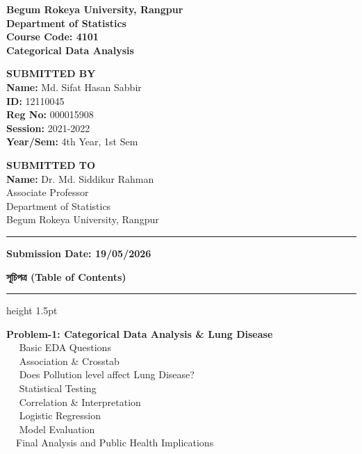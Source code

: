 \documentclass[12pt,a4paper]{article}
\newcommand{\tocline}[1]{\vspace{0.25cm}\noindent\textbf{\large #1}\\[0.1cm]}
\newcommand{\tocsub}[1]{\noindent\hspace*{6mm}\textbullet~~#1\\[0.05cm]}
\begin{document}
\begin{titlepage}
\centering
{\Large\bfseries Begum Rokeya University, Rangpur}\\[0.4cm]
{\large\bfseries Department of Statistics}\\[2.5cm]
\vfill
{\large\bfseries Course Code: 4101}\\[0.3cm]
{\LARGE\bfseries Categorical Data Analysis}\\[3cm]
\vfill

\begin{minipage}[t]{0.48\textwidth}
\raggedright
{\large\bfseries SUBMITTED BY}\\[0.2cm]
\textbf{Name:} Md. Sifat Hasan Sabbir\\
\textbf{ID:} 12110045\\
\textbf{Reg No:} 000015908\\
\textbf{Session:} 2021-2022\\
\textbf{Year/Sem:} 4th Year, 1st Sem
\end{minipage}
\hfill
\begin{minipage}[t]{0.48\textwidth}
\raggedleft
{\large\bfseries SUBMITTED TO}\\[0.2cm]
\textbf{Name:} Dr. Md. Siddikur Rahman\\
Associate Professor\\
Department of Statistics\\
Begum Rokeya University, Rangpur
\end{minipage}

\vfill
\hrule
\vspace{0.3cm}
{\large\bfseries Submission Date: 19/05/2026}
\end{titlepage}

\newpage
\begin{center}
    \vspace*{0.2cm}
    {\Large\bfseries সূচিপত্র (Table of Contents)} \\[0.2cm]
    \hrule height 1.5pt
\end{center}
\vspace{0.5cm}

\tocline{Problem-1: Categorical Data Analysis \& Lung Disease}
\tocsub{ Basic EDA Questions}
\tocsub{ Association & Crosstab}
\tocsub{ Does Pollution level affect Lung Disease?}
\tocsub{ Statistical Testing}
\tocsub{ Correlation & Interpretation}
\tocsub{ Logistic Regression}
\tocsub{ Model Evaluation}
\tocsub{Final Analysis and Public Health Implications}
\end{document}
